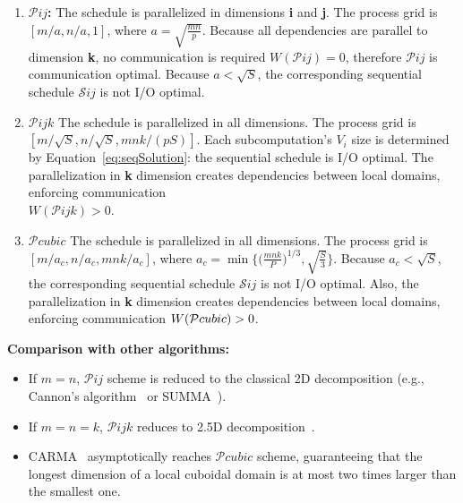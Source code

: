 \documentclass[sigplan,review,anonymous]{acmart}\settopmatter{printfolios=true,printccs=false,printacmref=false}
\newcommand\greg[1]{\textcolor{blue}{[Greg: #1]}}
\newcommand{\macb}[1]{\textbf{\textsf{#1}}}
\begin{document}
\begin{enumerate}
  \item \textbf{$\mathcal{P}ij$:} 
  The schedule is parallelized in dimensions \textbf{i} and 
  \textbf{j}. The process grid is $[m/a , n/a, 1]$, where $a = 
  \sqrt{\frac{mn}{p}}$.
  Because all dependencies are parallel to dimension \textbf{k}, no 
  communication is required $W(\mathcal{P}ij) = 0$, therefore 
  $\mathcal{P}ij$ is communication optimal. Because $a < \sqrt{S}$, the 
  corresponding sequential schedule $\mathcal{S}ij$ is not I/O optimal.
  \item \textbf{$\mathcal{P}ijk$} The schedule is parallelized in all 
  dimensions. The process grid is $[m/\sqrt{S} , n/\sqrt{S}, 
  mnk/(pS)]$.
   Each subcomputation's $V_i$ size is determined by 
  Equation~\ref{eq:seqSolution}: the sequential schedule is I/O optimal. The 
  parallelization in \textbf{k} dimension creates dependencies between local 
  domains, enforcing communication \\ $W(\mathcal{P}ijk) > 0$. 
  \item \textbf{$\mathcal{P}cubic$} The schedule is parallelized in all 
  dimensions. The process grid is $[m/a_c , n/a_c, 
  mnk/a_c]$, where $a_c = 
  \min\Big\{\big(\frac{mnk}{P}\big)^{1/3}, 
  \sqrt{\frac{S}{3}}\Big\}$. Because $a_c < \sqrt{S}$, the 
  corresponding sequential schedule $\mathcal{S}ij$ is not I/O optimal. 
  Also,  the 
  parallelization in \textbf{k} dimension creates dependencies between local 
  domains, enforcing communication $W(\mathcal{P}cubic) >\nobreak 0$. 
\end{enumerate}

\macb{Comparison with other algorithms:}

\begin{itemize}
  \item If $m = n$, $\mathcal{P}ij$ scheme is reduced to the
  classical 2D 
  decomposition (e.g., Cannon's algorithm~\cite{Cannon} or 
  SUMMA~\cite{summa}). 
  \item If $m = n = k$, $\mathcal{P}ijk$ reduces to 2.5D 
  decomposition~\cite{25d}.
  \item CARMA~\cite{CARMA} asymptotically reaches $\mathcal{P}cubic$
  scheme, 
  guaranteeing that 
  the longest dimension of a local cuboidal domain is at most two times 
  larger than the 
  smallest one.
\end{itemize}


%
\end{document}
